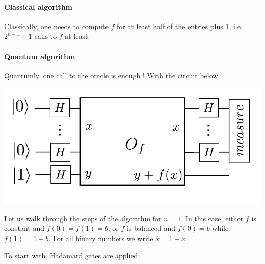 \documentclass{article}
\begin{document}
\paragraph{Classical algorithm} Classically, one needs to compute $f$ for at least
half of the entries plus 1, i.e. $2^{n-1}+1$ calls to $f$ at least.

\paragraph{Quantum algorithm} Quantumly, one call to the oracle is enough ! With
the circuit below.

\begin{center}
\includegraphics[width=.6\textwidth]{deutsch_josza.pdf}
\end{center}

Let us walk through the steps of the algorithm for $n=1$.
In this case, either $f$ is constant and $f(0)=f(1)=b$, 
or $f$ is balanced and $f(0)=b$ while $f(1)=1-b$.
For all binary numbers we write $\overline{x}=1-x$

To start with, Hadamard gates are applied:
\end{document}
